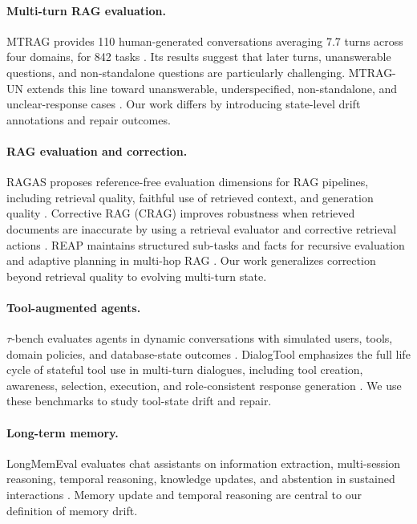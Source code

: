 \documentclass[letterpaper]{article}
\begin{document}
\paragraph{Multi-turn RAG evaluation.}
MTRAG provides 110 human-generated conversations averaging 7.7 turns across four domains, for 842 tasks \cite{mtrag2025}. Its results suggest that later turns, unanswerable questions, and non-standalone questions are particularly challenging. MTRAG-UN extends this line toward unanswerable, underspecified, non-standalone, and unclear-response cases \cite{mtragun2026}. Our work differs by introducing state-level drift annotations and repair outcomes.

\paragraph{RAG evaluation and correction.}
RAGAS proposes reference-free evaluation dimensions for RAG pipelines, including retrieval quality, faithful use of retrieved context, and generation quality \cite{ragas2023}. Corrective RAG (CRAG) improves robustness when retrieved documents are inaccurate by using a retrieval evaluator and corrective retrieval actions \cite{crag2024}. REAP maintains structured sub-tasks and facts for recursive evaluation and adaptive planning in multi-hop RAG \cite{reap2026}. Our work generalizes correction beyond retrieval quality to evolving multi-turn state.

\paragraph{Tool-augmented agents.}
$\tau$-bench evaluates agents in dynamic conversations with simulated users, tools, domain policies, and database-state outcomes \cite{taubench2024}. DialogTool emphasizes the full life cycle of stateful tool use in multi-turn dialogues, including tool creation, awareness, selection, execution, and role-consistent response generation \cite{dialogtool2025}. We use these benchmarks to study tool-state drift and repair.

\paragraph{Long-term memory.}
LongMemEval evaluates chat assistants on information extraction, multi-session reasoning, temporal reasoning, knowledge updates, and abstention in sustained interactions \cite{longmemeval2024}. Memory update and temporal reasoning are central to our definition of memory drift.
\end{document}
